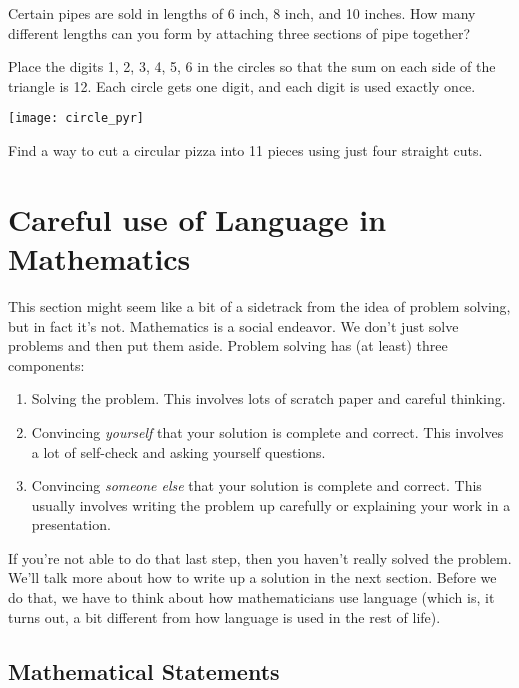 \begin{problem}
Certain pipes are sold in lengths of 6 inch, 8 inch, and 10 inches.  How many different lengths can you form by attaching three sections of pipe together?
\end{problem}

\begin{problem}
Place the digits 1, 2, 3, 4, 5, 6 in the circles so that the sum on each side of the triangle is 12.  Each circle gets one digit, and each digit is used exactly once.
\begin{center}
\texttt{[image: circle\_pyr]}
\end{center}

\end{problem}


\begin{problem}
Find a way to cut a circular pizza into 11 pieces using just four straight cuts.
\end{problem}



\section{Careful use of Language in Mathematics}
This section might seem like a bit of a sidetrack from the idea of problem solving, but in fact it's not.  Mathematics is a social endeavor.  We don't just solve problems and then put them aside.  Problem solving has (at least) three components:
\begin{enumerate}
\item
Solving the problem.  This involves lots of scratch paper and careful thinking.
\item
Convincing \emph{yourself} that your solution is complete and correct.  This involves a lot of self-check and asking yourself questions.
\item
Convincing \emph{someone else} that your solution is complete and correct.  This usually involves writing the problem up carefully or explaining your work in a presentation.
\end{enumerate}

If you're not able to do that last step, then you haven't really solved the problem.  We'll talk more about how to write up a solution in the next section.  Before we do that, we have to think about how mathematicians use language (which is, it turns out, a bit different from how language is used in the rest of life).

\subsection{Mathematical Statements}

